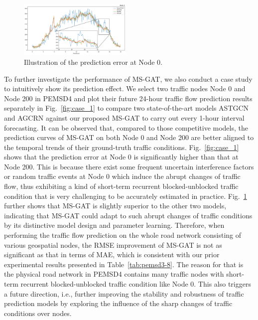 \begin{figure}[!ht]
    \centering
    \includegraphics[width=0.48\textwidth]{pictures/Case_2.png}
    \caption{Illustration of the prediction error at Node 0.}
    \label{fig:case_2}
\end{figure}

To further investigate the performance of MS-GAT, we also conduct a case study to intuitively show its prediction effect. We select two traffic nodes Node 0 and Node 200 in PEMSD4 and plot their future 24-hour traffic flow prediction results separately in Fig.~\ref{fig:case_1} to compare two state-of-the-art models ASTGCN and AGCRN against our proposed MS-GAT to carry out every 1-hour interval forecasting. It can be observed that, compared to those competitive models, the prediction curves of MS-GAT on both Node 0 and Node 200 are better aligned to the temporal trends of their ground-truth traffic conditions. Fig.~\ref{fig:case_1} shows that the prediction error at Node 0 is significantly higher than that at Node 200. This is because there exist some frequent uncertain interference factors or random traffic events at Node 0 which induce the abrupt changes of traffic flow, thus exhibiting a kind of short-term recurrent blocked-unblocked traffic condition that is very challenging to be accurately estimated in practice. Fig.~\ref{fig:case_2} further shows that MS-GAT is slightly superior to the other two models, indicating that MS-GAT could adapt to such  abrupt changes of traffic conditions by its distinctive model design and parameter learning. Therefore, when performing the traffic flow prediction on the whole road network consisting of various geospatial nodes, the RMSE improvement of MS-GAT is not as significant as that in terms of MAE, which is consistent with our prior experimental results presented in Table~\ref{tab:pemsd3-8}. The reason for that is the physical road network in PEMSD4 contains many traffic nodes with short-term recurrent blocked-unblocked traffic condition like Node 0. This also triggers a future direction, i.e., further improving the stability and robustness of traffic prediction models by exploring the influence of the sharp changes of traffic conditions over nodes.


